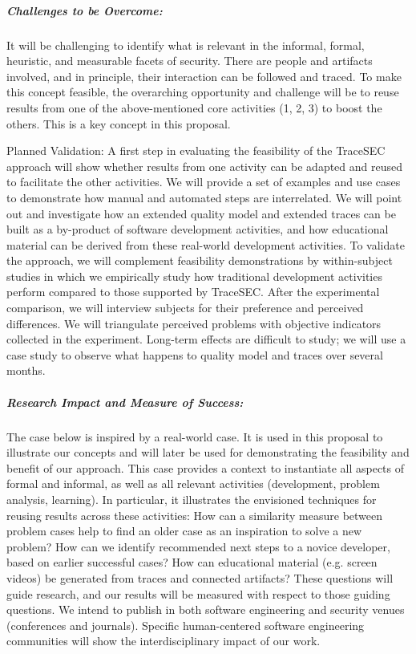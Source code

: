 \subparagraph*{Challenges to be Overcome:}
It will be challenging to identify what is relevant in the informal, formal, heuristic, and measurable facets of security. There are people and artifacts involved, and in principle, their interaction can be followed and traced. To make this concept feasible, the overarching opportunity and challenge will be to reuse results from one of the above-mentioned core activities (1, 2, 3) to boost the others. This is a key concept in this proposal.

Planned Validation: A first step in evaluating the feasibility of the TraceSEC approach will show whether results from one activity can be adapted and reused to facilitate the other activities. We will provide a set of examples and use cases to demonstrate how manual and automated steps are interrelated. We will point out and investigate how an extended quality model and extended traces can be built as a by-product of software development activities, and how educational material can be derived from these real-world development activities. To validate the approach, we will complement feasibility demonstrations by within-subject studies in which we empirically study how traditional develop­ment activities perform compared to those supported by TraceSEC. After the experimental comparison, we will interview subjects for their preference and perceived differences. We will triangulate perceived problems with objective indicators collected in the experiment. Long-term effects are difficult to study; we will use a case study to observe what happens to quality model and traces over several months.

\subparagraph*{Research Impact and Measure of Success:} The case below is inspired by a real-world case. It is used in this proposal to illustrate our concepts and will later be used for demonstrating the feasibility and benefit of our approach. This case provides a context to instantiate all aspects of formal and informal, as well as all relevant activities (development, problem analysis, learning). In particular, it illustrates the envisioned techniques for reusing results across these activities: How can a similarity measure between problem cases help to find an older case as an inspiration to solve a new problem? How can we identify recommended next steps to a novice developer, based on earlier successful cases? How can educational material (e.g. screen videos) be generated from traces and connected artifacts? These questions will guide research, and our results will be measured with respect to those guiding questions. We intend to publish in both software engineering and security venues (conferences and journals). Specific human-centered software engineering communities will show the interdisciplinary impact of our work.

